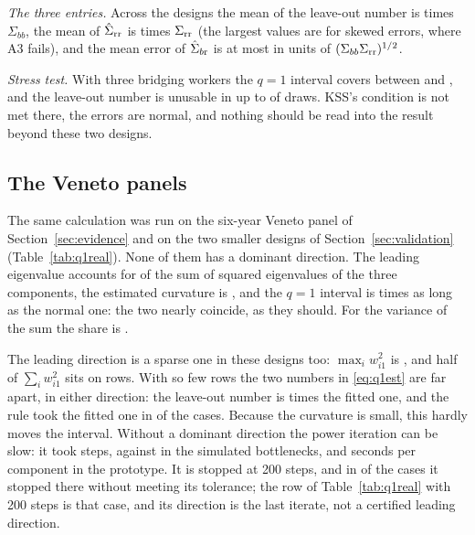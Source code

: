 \emph{The three entries.} Across the  designs the mean of the leave-out number is  times
$\Sigma_{bb}$, the mean of $\hat\Sigma_{\rm rr}$ is  times $\Sigma_{\rm rr}$ (the largest values are
for skewed errors, where A3 fails), and the mean error of $\hat\Sigma_{b{\rm r}}$ is at most  in
units of $(\Sigma_{bb}\Sigma_{\rm rr})^{1/2}$.

\emph{Stress test.} With three bridging workers the $q=1$ interval covers between  and
, and the leave-out number is unusable in up to  of draws. KSS's condition
is not met there, the errors are normal, and nothing should be read into the result beyond these two designs.

\subsection{The Veneto panels}\label{sec:q1real}

The same calculation was run on the six-year Veneto panel of Section~\ref{sec:evidence} and on the two smaller
designs of Section~\ref{sec:validation} (Table~\ref{tab:q1real}). None of them has a dominant direction. The
leading eigenvalue accounts for  of the sum of squared eigenvalues of the three components, the
estimated curvature is , and the $q=1$ interval is  times as long as the
normal one: the two nearly coincide, as they should. For the variance of the sum the share is
.

The leading direction is a sparse one in these designs too: $\max_iw_{i1}^2$ is , and half of
$\sum_iw_{i1}^2$ sits on  rows. With so few rows the two numbers in \eqref{eq:q1est} are far apart,
in either direction: the leave-out number is  times the fitted one, and the rule took the
fitted one in  of the  cases. Because the curvature is small, this hardly moves
the interval. Without a dominant direction the power iteration can be slow: it took  steps,
against  in the simulated bottlenecks, and  seconds per component
in the prototype. It is stopped at 200 steps, and in  of the  cases it stopped
there without meeting its tolerance; the row of Table~\ref{tab:q1real} with 200 steps is that case, and its
direction is the last iterate, not a certified leading direction.

